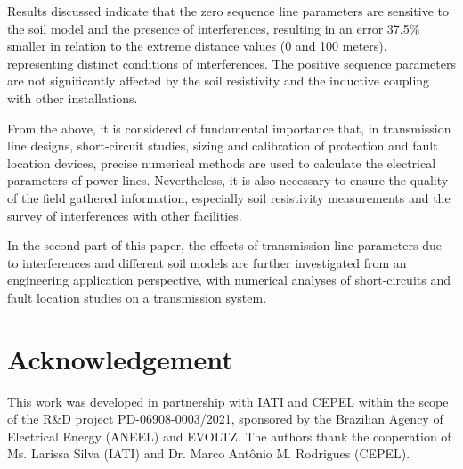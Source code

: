 \documentclass[conference]{IEEEtran}
\begin{document}
	Results discussed indicate that the zero sequence line parameters are sensitive to the soil model and the presence of interferences, resulting in an error 37.5\% smaller in relation to the extreme distance values (0 and 100 meters), representing distinct conditions of interferences. The positive sequence parameters are not significantly affected by the soil resistivity and the inductive coupling with other installations.
	
	From the above, it is considered of fundamental importance that, in transmission line designs, short-circuit studies, sizing and calibration of protection and fault location devices, precise numerical methods are used to calculate the electrical parameters of power lines. Nevertheless, it is also necessary to ensure the quality of the field gathered information, especially soil resistivity measurements and the survey of interferences with other facilities. 
	
	In the second part of this paper, the effects of transmission line parameters due to interferences and different soil models are further investigated from an engineering application perspective, with numerical analyses 
	of short-circuits and fault location studies on a transmission system.  

	\section*{Acknowledgement}
This work was developed  in partnership with IATI and CEPEL within the scope of the R\&D project PD-06908-0003/2021, sponsored by the Brazilian Agency of Electrical Energy (ANEEL) and EVOLTZ. The authors thank the cooperation of Ms. Larissa Silva (IATI) and Dr. Marco Antônio M. Rodrigues (CEPEL).
	
	
	
	\nocite{*}
	
	
	
\end{document}
